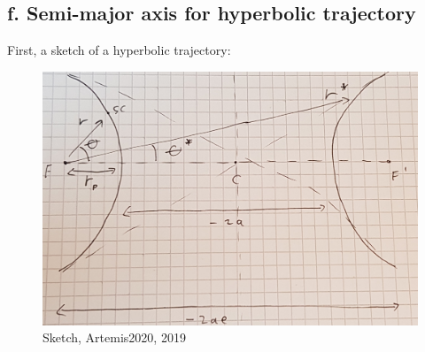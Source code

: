 \subsection{f. Semi-major axis for hyperbolic trajectory}
First, a sketch of a hyperbolic trajectory: 
\begin{figure}[h]
\centering
\includegraphics[scale=0.15]{chapters/sketch1.jpg}
\caption{Sketch, Artemis2020, 2019}
\end{figure}

